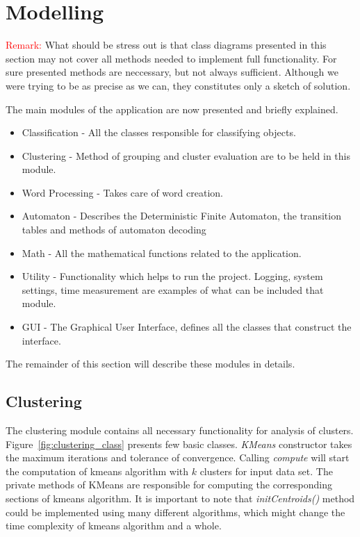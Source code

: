 \documentclass{article}
\begin{document}
\section{Modelling}

\textcolor{red}{Remark:} What should be stress out is that class diagrams presented in this section may not cover all methods needed to implement full functionality. For sure presented methods are neccessary, but not always sufficient. Although we were trying to be as precise as we can, they constitutes only a sketch of solution.

The main modules of the application are now presented and briefly explained.

\begin{itemize}

	\item 
		{{Classification}} - All the classes responsible for classifying objects.
	\item 
		{{Clustering}} - Method of grouping and cluster evaluation are to be held in this module.
	\item
		{{Word Processing}} - Takes care of word creation.
	\item 
		{{Automaton}} - Describes the Deterministic Finite Automaton, the transition tables and methods of automaton decoding 
	\item 
		{{Math}} - All the mathematical functions related to the application.
	\item 
		{{Utility}} - Functionality which helps to run the project. Logging, system settings, time measurement are examples of what can be included that module.
	\item
		{{GUI}} - The Graphical User Interface, defines all the classes that construct the interface.

\end{itemize}

The remainder of this section will describe these modules in details.


\newpage
\subsection{Clustering}

The clustering module contains all necessary functionality for analysis of clusters. Figure~\ref{fig:clustering_class} presents few basic classes. \textit{KMeans} constructor takes the maximum iterations and tolerance of convergence. Calling \textit{compute} will start the computation of kmeans algorithm with $k$ clusters for input data set. The private methods of KMeans are responsible for computing the corresponding sections of kmeans algorithm. It is important to note that \textit{initCentroids()} method could be implemented using many different algorithms, which might change the time complexity of kmeans algorithm and a whole.
\end{document}
